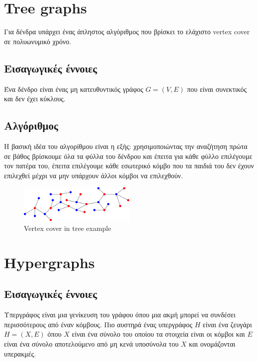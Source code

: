 \section{Tree graphs}
Για δένδρα υπάρχει ένας άπληστος αλγόριθμος που βρίσκει το ελάχιστο vertex cover σε πολυωνυμικό χρόνο.

\subsection{Εισαγωγικές έννοιες}
Ένα δένδρο είναι ένας μη κατευθυντικός γράφος $G=(V,E)$ που είναι συνεκτικός και δεν έχει κύκλους.

\subsection{Αλγόριθμος}
Η βασική ιδέα του αλγορίθμου είναι η εξής: χρησιμοποιώντας την αναζήτηση πρώτα σε βάθος βρίσκουμε όλα τα φύλλα του δένδρου και έπειτα για κάθε φύλλο επιλέγουμε τον πατέρα του, έπειτα επιλέγουμε κάθε εσωτερικό κόμβο που τα παιδιά του δεν έχουν επιλεχθεί μέχρι να μην υπάρχουν άλλοι κόμβοι να επιλεχθούν.

\begin{figure}[H]
\caption{Vertex cover in tree example}
\centering
\includegraphics[width=0.5\textwidth]{Figures/vc_tree.png}\centering
\end{figure}


\section{Hypergraphs}
\subsection{Εισαγωγικές έννοιες}
Υπεργράφος είναι μια γενίκευση του γράφου όπου μια ακμή μπορεί να συνδέσει περισσότερους από έναν κόμβους. Πιο αυστηρά ένας υπεργράφος $H$ είναι ένα ζευγάρι $H=(X,E)$ όπου $X$ είναι ένα σύνολο του οποίου τα στοιχεία είναι οι κόμβοι και $E$ είναι ένα σύνολο αποτελούμενο από μη κενά υποσύνολα του $X$ και ονομάζονται υπερακμές. 

